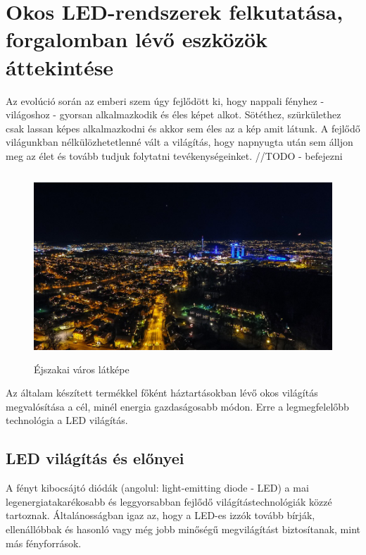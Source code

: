 \documentclass[../main.tex]{subfiles}
\begin{document}
\section{Okos LED-rendszerek felkutatása, forgalomban lévő eszközök áttekintése}
    Az evolúció során az emberi szem úgy fejlődött ki, hogy nappali fényhez - világoshoz - gyorsan alkalmazkodik és éles képet alkot. Sötéthez, szürkülethez csak lassan képes alkalmazkodni és akkor sem éles az a kép amit látunk. A fejlődő világunkban nélkülözhetetlenné vált a világítás, hogy napnyugta után sem álljon meg az élet és tovább tudjuk folytatni tevékenységeinket. //TODO - befejezni
    \begin{figure}[h!] %
        \centering
            \includegraphics[height=7cm]{irodalom_res/night_life.jpg}
        \caption{Éjszakai város látképe} %
    \end{figure}
    
    Az általam készített termékkel főként háztartásokban lévő okos világítás megvalósítása a cél, minél energia gazdaságosabb módon. Erre a legmegfelelőbb technológia a LED világítás.
    
    \subsection{LED világítás és előnyei} %
    
    A fényt kibocsájtó diódák (angolul: light-emitting diode - LED) a mai legenergiatakarékosabb és leggyorsabban fejlődő világítástechnológiák közzé tartoznak. Általánosságban igaz az, hogy a LED-es izzók tovább bírják, ellenállóbbak és hasonló vagy még jobb minőségű megvilágítást biztosítanak, mint más fényforrások.
    
\end{document}
